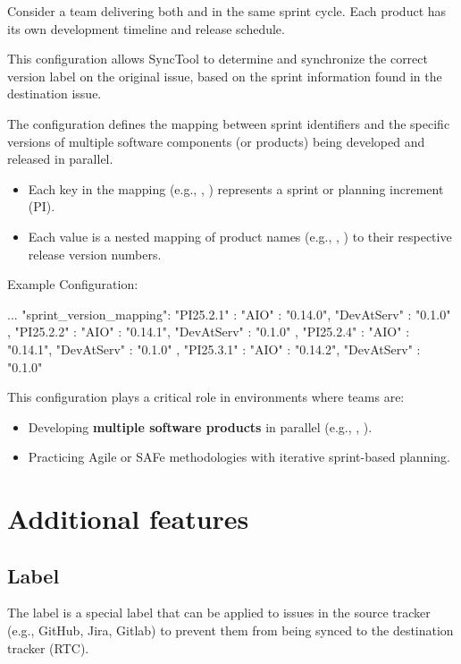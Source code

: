 Consider a team delivering both  and  in the same
sprint cycle.
Each product has its own development timeline and release schedule.

This configuration allows SyncTool to determine and synchronize the correct
version label on the original issue, based on the sprint information found in
the destination issue.

The  configuration defines the mapping between
sprint identifiers and the specific versions of multiple software components
(or products) being developed and released in parallel.
\begin{itemize}
  \item Each key in the mapping (e.g., , )
        represents a sprint or planning increment (PI).
  \item Each value is a nested mapping of product names (e.g., ,
        ) to their respective release version numbers.
\end{itemize}

Example Configuration:
\begin{pythoncode}
{
   ...
   "sprint_version_mapping": {
      "PI25.2.1" : {
         "AIO" : "0.14.0",
         "DevAtServ" : "0.1.0"
      },
      "PI25.2.2" : {
         "AIO" : "0.14.1",
         "DevAtServ" : "0.1.0"
      },
      "PI25.2.4" : {
         "AIO" : "0.14.1",
         "DevAtServ" : "0.1.0"
      },
      "PI25.3.1" : {
         "AIO" : "0.14.2",
         "DevAtServ" : "0.1.0"
      }
   }
}
\end{pythoncode}

This configuration plays a critical role in environments where teams are:
\begin{itemize}
  \item Developing \textbf{multiple software products} in parallel
        (e.g., , ).
  \item Practicing Agile or SAFe methodologies with iterative sprint-based
        planning.
\end{itemize}

\hypertarget{additional-features}{%
\section{Additional features}\label{additional-features}}

\subsection{ Label}
The  label is a special label that can be applied to issues in the
source tracker (e.g., GitHub, Jira, Gitlab) to prevent them from being synced to
the destination tracker (RTC).


